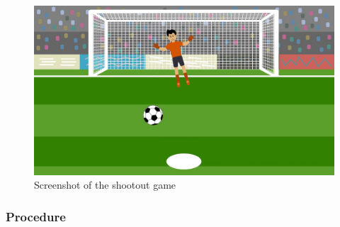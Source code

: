 \documentclass[man,floatsintext]{apa6}
\begin{document}
\begin{figure}

{\centering \includegraphics{images/shootout} 

}

\caption{Screenshot of the shootout game}\label{fig:screenshot-shootout}
\end{figure}

\hypertarget{procedure-1}{%
\subsubsection{Procedure}\label{procedure-1}}
\end{document}
